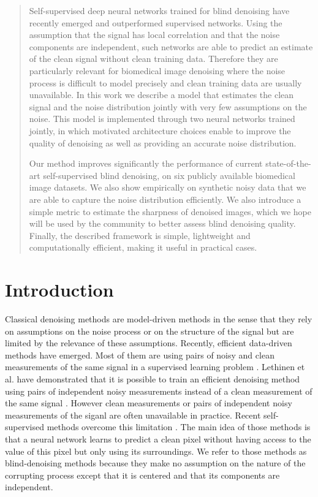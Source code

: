 \documentclass{article}
\begin{document}
\begin{abstract}
Self-supervised deep neural networks trained for blind denoising have recently emerged and outperformed supervised networks. Using the assumption that the signal has local correlation and that the noise components are independent, such networks are able to predict an estimate of the clean signal without clean training data. Therefore they are particularly relevant for biomedical image denoising where the noise process is difficult to model precisely and clean training data are usually unavailable.
In this work we describe a model that estimates the clean signal and the noise distribution jointly with very few assumptions on the noise. This model is implemented through two neural networks trained jointly, in which motivated architecture choices enable to improve the quality of denoising as well as providing an accurate noise distribution.

Our method improves significantly the performance of current state-of-the-art self-supervised blind denoising, on six publicly available biomedical image datasets. We also show empirically on synthetic noisy data that we are able to capture the noise distribution efficiently. We also introduce a simple metric to estimate the sharpness of denoised images, which we hope will be used by the community to better assess blind denoising quality. Finally, the described framework is simple, lightweight and computationally efficient, making it useful in practical cases.
\end{abstract}

\section{Introduction}
\label{sec:introduction}
Classical denoising methods are model-driven methods in the sense that they rely on assumptions on the noise process or on the structure of the signal but are limited by the relevance of these assumptions.
Recently, efficient data-driven methods have emerged. Most of them are using pairs of noisy and clean measurements of the same signal in a supervised learning problem \cite{weigert2017content}. Lethinen et al. have demonstrated that it is possible to train an efficient denoising method using pairs of independent noisy measurements instead of a clean measurement of the same signal \cite{lehtinen2018noise2noise}. However clean measurements or pairs of independent noisy measurements of the siganl are often unavailable in practice.
Recent self-supervised methods overcome this limitation \cite{batson2019noise2self,krull2018noise2void}. The main idea of those methods is that a neural network learns to predict a clean pixel without having access to the value of this pixel but only using its surroundings. We refer to those methods as blind-denoising methods because they make no assumption on the nature of the corrupting process except that it is centered and that its components are independent.
\end{document}
